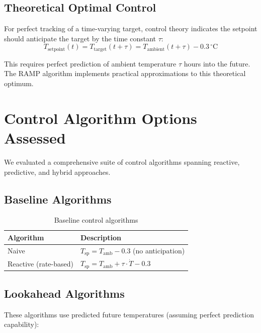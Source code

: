 \documentclass[11pt,letterpaper]{article}
\begin{document}
\subsection{Theoretical Optimal Control}

For perfect tracking of a time-varying target, control theory indicates the setpoint should anticipate the target by the time constant $\tau$:
\begin{equation}
T_{\text{setpoint}}(t) = T_{\text{target}}(t + \tau) = T_{\text{ambient}}(t + \tau) - 0.3\,^\circ\text{C}
\label{eq:optimal}
\end{equation}

This requires perfect prediction of ambient temperature $\tau$ hours into the future. The RAMP algorithm implements practical approximations to this theoretical optimum.

\section{Control Algorithm Options Assessed}

We evaluated a comprehensive suite of control algorithms spanning reactive, predictive, and hybrid approaches.

\subsection{Baseline Algorithms}

\begin{table}[H]
\centering
\caption{Baseline control algorithms}
\begin{tabular}{lp{8cm}}
\toprule
\textbf{Algorithm} & \textbf{Description} \\
\midrule
Naive & $T_{\text{sp}} = T_{\text{amb}} - 0.3$ (no anticipation) \\
Reactive (rate-based) & $T_{\text{sp}} = T_{\text{amb}} + \tau \cdot \dot{T} - 0.3$ \\
\bottomrule
\end{tabular}
\end{table}

\subsection{Lookahead Algorithms}

These algorithms use predicted future temperatures (assuming perfect prediction capability):
\end{document}
